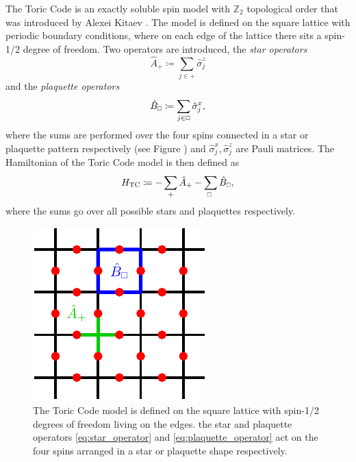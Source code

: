 The Toric Code is an exactly soluble spin model with $\mathbb{Z}_2$ topological order that was introduced by Alexei Kitaev \cite{cite:fault_tolerant_quantum_computation_by_anyons}. The model is defined on the square lattice with periodic boundary conditions, where on each edge of the lattice there sits a spin-1/2 degree of freedom. Two operators are introduced, the \textit{star operators}
\begin{equation}
	\label{eq:star_operator}
	\hat{A}_+ \coloneqq \sum_{j\in+}\hat{\sigma}_j^z
\end{equation}
and the \textit{plaquette operators}
\begin{equation}
	\label{eq:plaquette_operator}
	\hat{B}_{\scalebox{0.6}{$\square$}} \coloneqq \sum_{j\in \scalebox{0.6}{$\square$}} \hat{\sigma}_j^x,
\end{equation}
where the sums are performed over the four spins connected in a star or plaquette pattern respectively (see Figure ) and $\hat{\sigma}_j^x, \hat{\sigma}_j^z$ are Pauli matrices. The Hamiltonian of the Toric Code model is then defined as
\begin{equation}
	\label{eq:toric_code_hamiltonian}
	H_\text{TC} \coloneqq -\sum_+\hat{A}_+ - \sum_{\scalebox{0.6}{$\square$}}\hat{B}_{\scalebox{0.6}{$\square$}},
\end{equation}
where the sums go over all possible stars and plaquettes respectively. 
\begin{figure}
	\centering
	\includegraphics[scale=1]{figures/tikz/toric_code/toric_code_general/toric_code_general.pdf}
	\caption{The Toric Code model is defined on the square lattice with spin-1/2 degrees of freedom living on the edges. the star and plaquette operators \eqref{eq:star_operator} and \eqref{eq:plaquette_operator} act on the four spins arranged in a star or plaquette shape respectively.}
	\label{fig:toric_code_star_and_plaquette_operators}
\end{figure}
